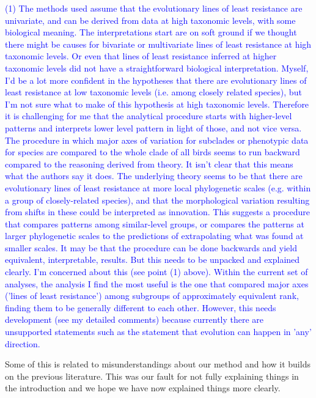 \documentclass[12pt,letterpaper]{article}
\begin{document}
{\textcolor{blue}{(1) The methods used assume that the evolutionary lines of least resistance are univariate, and can be derived from data at high taxonomic levels, with some biological meaning. The interpretations start are on soft ground if we thought there might be causes for bivariate or multivariate lines of least resistance at high taxonomic levels. Or even that lines of least resistance inferred at higher taxonomic levels did not have a straightforward biological interpretation. Myself, I'd be a lot more confident in the hypotheses that there are evolutionary lines of least resistance at low taxonomic levels (i.e. among closely related species), but I'm not sure what to make of this hypothesis at high taxonomic levels. Therefore it is challenging for me that the analytical procedure starts with higher-level patterns and interprets lower level pattern in light of those, and not vice versa. The procedure in which major axes of variation for subclades or phenotypic data for species are compared to the whole clade of all birds seems to run backward compared to the reasoning derived from theory. It isn't clear that this means what the authors say it does. The underlying theory seems to be that there are evolutionary lines of least resistance at more local phylogenetic scales (e.g. within a group of closely-related species), and that the morphological variation resulting from shifts in these could be interpreted as innovation. This suggests a procedure that compares patterns among similar-level groups, or compares the patterns at larger phylogenetic scales to the predictions of extrapolating what was found at smaller scales. It may be that the procedure can be done backwards and yield equivalent, interpretable, results. But this needs to be unpacked and explained clearly. I'm concerned about this (see point (1) above).
Within the current set of analyses, the analysis I find the most useful is the one that compared major axes ('lines of least resistance') among subgroups of approximately equivalent rank, finding them to be generally different to each other. However, this needs development (see my detailed comments) because currently there are unsupported statements such as the statement that evolution can happen in 'any' direction.}

Some of this is related to misunderstandings about our method and how it builds on the previous literature. This was our fault for not fully explaining things in the introduction and we hope we have now explained things more clearly.

}
\end{document}
